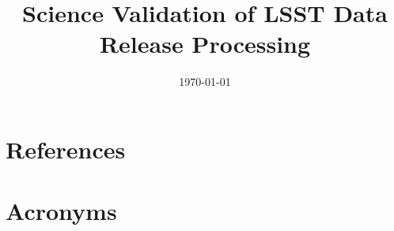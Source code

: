 \documentclass[modern]{aastex62}
\begin{document}

\date{\today}
\title{ Science Validation of LSST Data Release Processing}






\appendix

\section{References} \label{sec:bib}



\section{Acronyms} \label{sec:acronyms}

\end{document}
